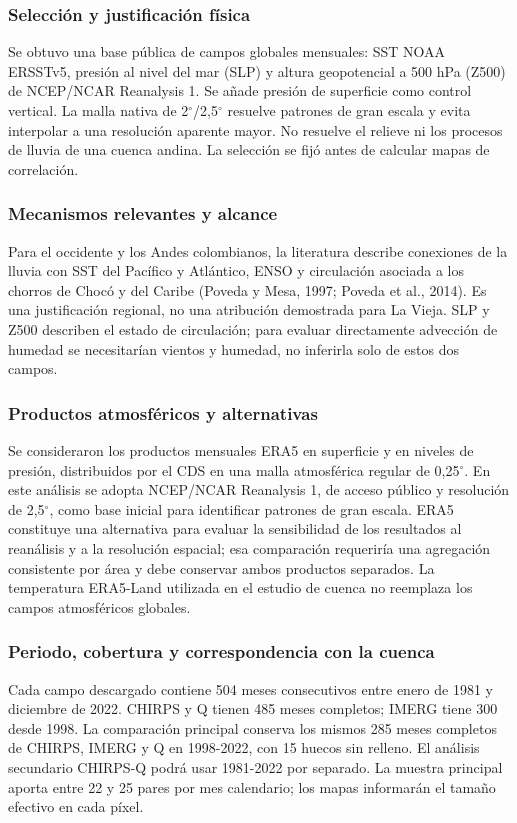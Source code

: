 \documentclass[10pt,a4paper]{article}
\begin{document}
\subsubsection*{Selección y justificación física}
Se obtuvo una base pública de campos globales mensuales: SST NOAA ERSSTv5, presión al nivel del mar (SLP) y altura geopotencial a 500 hPa (Z500) de NCEP/NCAR Reanalysis 1. Se añade presión de superficie como control vertical. La malla nativa de 2$^\circ$/2,5$^\circ$ resuelve patrones de gran escala y evita interpolar a una resolución aparente mayor. No resuelve el relieve ni los procesos de lluvia de una cuenca andina. La selección se fijó antes de calcular mapas de correlación.

\subsubsection*{Mecanismos relevantes y alcance}
Para el occidente y los Andes colombianos, la literatura describe conexiones de la lluvia con SST del Pacífico y Atlántico, ENSO y circulación asociada a los chorros de Chocó y del Caribe (Poveda y Mesa, 1997; Poveda et al., 2014). Es una justificación regional, no una atribución demostrada para La Vieja. SLP y Z500 describen el estado de circulación; para evaluar directamente advección de humedad se necesitarían vientos y humedad, no inferirla solo de estos dos campos.

\subsubsection*{Productos atmosféricos y alternativas}
Se consideraron los productos mensuales ERA5 en superficie y en niveles de presión, distribuidos por el CDS en una malla atmosférica regular de 0,25$^\circ$. En este análisis se adopta NCEP/NCAR Reanalysis 1, de acceso público y resolución de 2,5$^\circ$, como base inicial para identificar patrones de gran escala. ERA5 constituye una alternativa para evaluar la sensibilidad de los resultados al reanálisis y a la resolución espacial; esa comparación requeriría una agregación consistente por área y debe conservar ambos productos separados. La temperatura ERA5-Land utilizada en el estudio de cuenca no reemplaza los campos atmosféricos globales.

\subsubsection*{Periodo, cobertura y correspondencia con la cuenca}
Cada campo descargado contiene 504 meses consecutivos entre enero de 1981 y diciembre de 2022. CHIRPS y Q tienen 485 meses completos; IMERG tiene 300 desde 1998. La comparación principal conserva los mismos 285 meses completos de CHIRPS, IMERG y Q en 1998-2022, con 15 huecos sin relleno. El análisis secundario CHIRPS-Q podrá usar 1981-2022 por separado. La muestra principal aporta entre 22 y 25 pares por mes calendario; los mapas informarán el tamaño efectivo en cada píxel.
\end{document}
